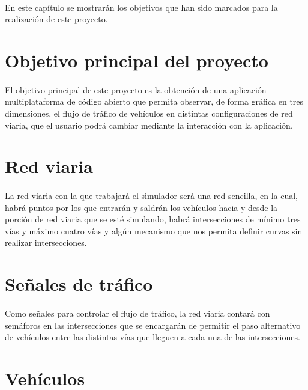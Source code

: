 	\paragraph{}
	En este capítulo se mostrarán los objetivos que han sido marcados para la realización de este proyecto.

\section{Objetivo principal del proyecto}

	\paragraph{}
	El objetivo principal de este proyecto es la obtención de una aplicación multiplataforma de código abierto que permita observar, de forma gráfica en tres dimensiones, el flujo de tráfico de vehículos en distintas configuraciones de red viaria, que el usuario podrá cambiar mediante la interacción con la aplicación.
	
\section{Red viaria}

	\paragraph{}
	La red viaria con la que trabajará el simulador será una red sencilla, en la cual, habrá puntos por los que entrarán y saldrán los vehículos hacia y desde la porción de red viaria que se esté simulando, habrá intersecciones de mínimo tres vías y máximo cuatro vías y algún mecanismo que nos permita definir curvas sin realizar intersecciones.

\section{Señales de tráfico}

	\paragraph{}
	Como señales para controlar el flujo de tráfico, la red viaria contará con semáforos en las intersecciones que se encargarán de permitir el paso alternativo de vehículos entre las distintas vías que lleguen a cada una de las intersecciones.
	
\section{Vehículos}
	
